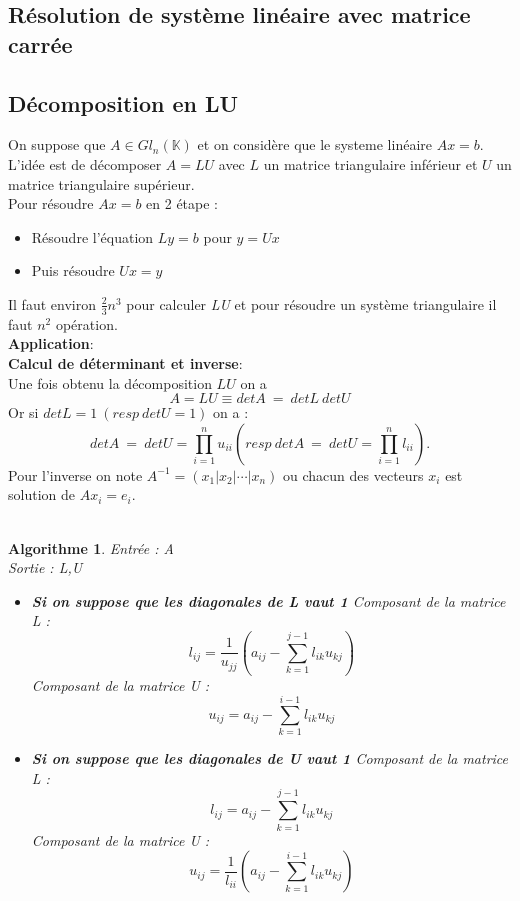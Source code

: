 \documentclass[a4paper, 12pt, french]{article}
\theoremstyle{break}
\newtheorem{algo}{Algorithme}
\begin{document}
\begin{center}\section{Résolution de système linéaire avec matrice carrée}\end{center}
\subsection{Décomposition en LU}
On suppose que $A \in Gl_{n}(\mathbb{K})$ et on considère que le systeme linéaire $Ax=b$. L'idée est de décomposer $A=LU$ avec $\mathit{L}$ un matrice triangulaire inférieur et $\mathit{U}$ un matrice triangulaire supérieur.\\
Pour résoudre $Ax=b$ en 2 étape :
\begin{itemize}
    \item[-] Résoudre l'équation $Ly=b$ pour $y=Ux$
    \item[-] Puis résoudre $Ux=y$
\end{itemize}    
Il faut environ $\frac{2}{3}n^{3}$ pour calculer \textit{LU} et pour résoudre un système triangulaire il faut $n^2$ opération.\\
\textbf{Application}:\\
\textbf{Calcul de déterminant et inverse}:\\
Une fois obtenu la décomposition $LU$ on a $$A=LU \equiv detA\:=\:detL\:detU$$
Or si $detL=1\:(resp\:detU=1)$ on a : $$detA\:=\:detU=\displaystyle\prod_{i=1}^{n} u_{ii}(resp\:detA\:=\:detU=\displaystyle\prod_{i=1}^{n} l_{ii}).$$
Pour l'inverse on note $A^{-1}=(x_{1}|x_{2}| \cdots |x_{n})$ ou chacun des vecteurs $x_{i}$ est solution de $Ax_{i}=e_{i}$.\\ \\

\begin{algo}
	Entrée : A \\
	Sortie : L,U \\
	\begin{itemize}
	\item[-] \textbf{Si on suppose que les diagonales de L vaut 1}
	Composant de la matrice L :
	$$ l_{ij} = \frac{1}{u_{jj}}(a_{ij}-\sum_{k=1}^{j-1}l_{ik}u_{kj}) $$
	Composant de la matrice U :
	$$ u_{ij} = a_{ij} - \sum_{k=1}^{i-1}l_{ik}u_{kj}$$
	\item[-] \textbf{Si on suppose que les diagonales de U vaut 1}
	Composant de la matrice L :
	$$ l_{ij} = a_{ij} - \sum_{k=1}^{j-1}l_{ik}u_{kj} $$
	Composant de la matrice U :
	$$ u_{ij} = \frac{1}{l_{ii}}(a_{ij} - \sum_{k=1}^{i-1}l_{ik}u_{kj})$$
	\end{itemize}
\end{algo}
\end{document}
